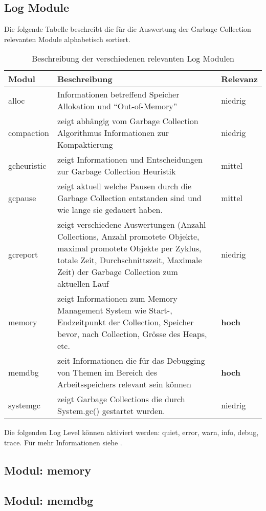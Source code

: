 \subsection{Log Module}

Die folgende Tabelle beschreibt die für die Auswertung der Garbage Collection relevanten Module alphabetisch sortiert. 

\begin{longtable}{|p{4cm}|p{9cm}|p{2cm}|}
    \caption{Beschreibung der verschiedenen relevanten Log Modulen}\\\hline
  \textbf{Modul} & \textbf{Beschreibung} & \textbf{Relevanz}\\\hline
  alloc & Informationen betreffend Speicher Allokation und ``Out-of-Memory'' & niedrig \\\hline
  compaction & zeigt abhängig vom Garbage Collection Algorithmus Informationen zur Kompaktierung& niedrig \\\hline
  gcheuristic & zeigt Informationen und Entscheidungen zur Garbage Collection Heuristik & mittel \\\hline
  gcpause & zeigt aktuell welche Pausen durch die Garbage Collection entstanden sind und wie lange sie gedauert haben. & mittel \\\hline
  gcreport & zeigt verschiedene Auswertungen (Anzahl Collections, Anzahl promotete Objekte, maximal promotete Objekte per Zyklus, totale Zeit, Durchschnittszeit, Maximale Zeit) der Garbage Collection zum aktuellen Lauf& niedrig \\\hline
  memory & zeigt Informationen zum Memory Management System wie Start-, Endzeitpunkt der Collection, Speicher bevor, nach Collection, Grösse des Heaps, etc.& \textbf{hoch} \\\hline
  memdbg & zeit Informationen die für das Debugging von Themen im Bereich des Arbeitsspeichers relevant sein können& \textbf{hoch} \\\hline
  systemgc & zeigt Garbage Collections die durch System.gc() gestartet wurden. & niedrig \\\hline
\end{longtable}

Die folgenden Log Level können aktiviert werden: quiet, error, warn, info, debug, trace. Für mehr Informationen siehe \cite{oracleJRockitR28CLR}.


\subsection{Modul: memory}


\subsection{Modul: memdbg}


